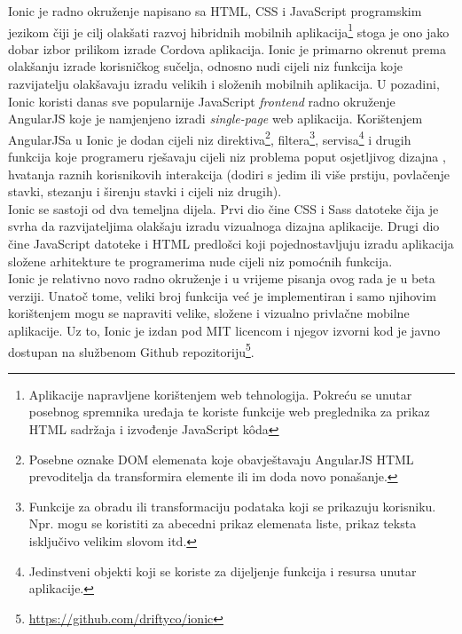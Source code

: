 Ionic je radno okruženje napisano sa HTML, CSS i JavaScript programskim jezikom čiji je cilj olakšati razvoj hibridnih mobilnih aplikacija\footnote{Aplikacije napravljene korištenjem web tehnologija. Pokreću se unutar posebnog spremnika uređaja te koriste funkcije web preglednika za prikaz HTML sadržaja i izvođenje JavaScript k\^oda} stoga je ono jako dobar izbor prilikom izrade Cordova aplikacija. 
Ionic je primarno okrenut prema olakšanju izrade korisničkog sučelja, odnosno nudi cijeli niz funkcija koje razvijatelju olakšavaju izradu velikih i složenih mobilnih aplikacija. 
U pozadini, Ionic koristi danas sve popularnije JavaScript \textit{frontend} radno okruženje AngularJS koje je namjenjeno izradi \textit{single-page} web aplikacija. 
Korištenjem AngularJSa u Ionic je dodan cijeli niz direktiva\footnote{Posebne oznake DOM elemenata koje obavještavaju AngularJS HTML prevoditelja da transformira elemente ili im doda novo ponašanje.}, filtera\footnote{Funkcije za obradu ili transformaciju podataka koji se prikazuju korisniku. Npr. mogu se koristiti za abecedni prikaz elemenata liste, prikaz teksta isključivo velikim slovom itd.}, servisa\footnote{Jedinstveni objekti  koji se koriste za dijeljenje funkcija i resursa unutar aplikacije.} i drugih funkcija koje programeru rješavaju cijeli niz problema poput osjetljivog dizajna , hvatanja raznih korisnikovih interakcija (dodiri s jedim ili više prstiju, povlačenje  stavki, stezanju i širenju stavki  i cijeli niz drugih). 
\\

Ionic se sastoji od dva temeljna dijela. Prvi dio čine CSS i Sass datoteke čija je svrha da razvijateljima olakšaju izradu vizualnoga dizajna aplikacije. 
Drugi dio čine JavaScript datoteke i HTML predlošci koji pojednostavljuju izradu aplikacija složene arhitekture te programerima nude cijeli niz pomoćnih funkcija.
\\

Ionic je relativno novo radno okruženje i u vrijeme pisanja ovog rada je u beta verziji. Unatoč tome, veliki broj funkcija već je implementiran i samo njihovim korištenjem mogu se napraviti velike, složene i vizualno privlačne mobilne aplikacije. 
Uz to, Ionic je izdan pod MIT licencom i njegov izvorni kod je javno dostupan na službenom Github repozitoriju\footnote{\url{https://github.com/driftyco/ionic}}.